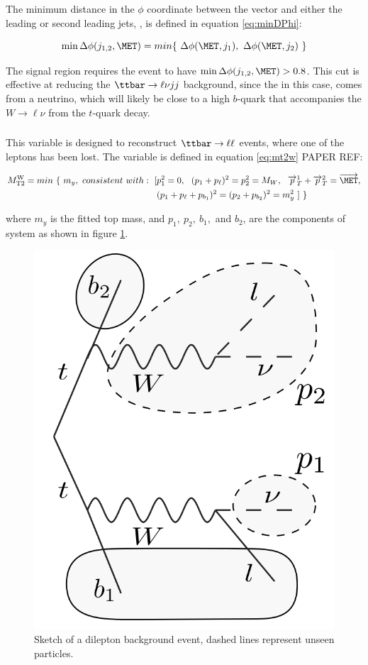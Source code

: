 The minimum distance in the $\phi$ coordinate between the \MET vector and either the leading or second leading \pt jets, \minDPhiMETjet, is defined in equation \ref{eq:minDPhi}:

\begin{equation}\label{eq:minDPhi}
\minDPhiMETjet = min\{~\Delta\phi(\MET,j_{1}),~\Delta\phi(\MET,j_{2})~\}
\end{equation}

The signal region requires the event to have $\minDPhiMETjet>0.8$.  This cut is effective at reducing the ${\ttbar\rightarrow\ell\nu}jj$ background, since the \MET in this case, comes from a neutrino, which will likely be close to a high \pt $b$-quark that accompanies the $W\rightarrow\ell\nu$ from the $t$-quark decay.  


\subsubsection{ \MTtW }
\label{sec:obj_sel:mt2w}

This variable is designed to reconstruct $\ttbar\rightarrow\ell\ell$ events, where one of the leptons has been lost.  The variable is defined in equation \ref{eq:mt2w} {\color{red} PAPER REF}:

\begin{align}\label{eq:mt2w}
\MTtW = min~\{~m_{y},~consistent~with:~ [ & p_{1}^{2}=0,~~(p_{1}+p_{\ell})^2=p_{2}^{2} = M_{W},~~\overrightarrow{p}_{T}^{1} + \overrightarrow{p}_{T}^{2}=\overrightarrow{\MET}, \\
& (p_{1}+p_{\ell}+p_{b_{1}})^{2}=(p_{2}+p_{b_{2}})^{2}=m_{y}^{2}~ ]~\}  
\end{align}

where $m_{y}$ is the fitted top mass, and $p_{1},~p_{2},~b_{1},$ and $b_{2}$, are the components of \ttbar system as shown in figure \ref{fig:mt2w_sketch}.

\begin{figure}[thb]
\begin{center}
\includegraphics[width=0.33\linewidth]{Figures/mt2w_sketch.png}
\caption{\label{fig:mt2w_sketch}
Sketch of a dilepton \ttbar background event, dashed lines represent unseen
particles.}
\end{center}
\end{figure}

